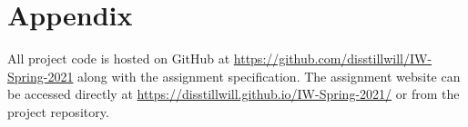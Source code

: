 \documentclass[pageno]{jpaper}
\begin{document}
\pagebreak




\appendix

\section{Appendix}

All project code is hosted on GitHub at \url{https://github.com/disstillwill/IW-Spring-2021} along with the assignment specification. The assignment website can be accessed directly at \url{https://disstillwill.github.io/IW-Spring-2021/} or from the project repository.
\end{document}
